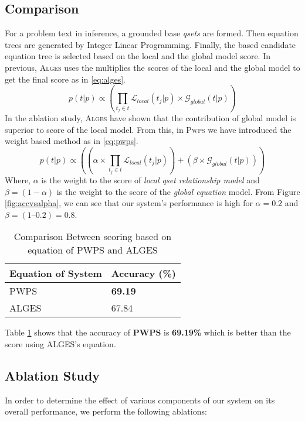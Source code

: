 \documentclass[document.tex]{subfiles}
\begin{document}
\subsection{Comparison}
For a problem text in inference, a grounded base \textit{qsets} are formed. Then equation trees are generated by Integer Linear Programming. Finally, the based candidate equation tree is selected based on the local and the global model score. In previous, \textsc{Alges} uses the multiplies the scores of the local and the global model to get the final score as in \eqref{eq:alges}.
\begin{equation}
p(t|p) \propto (\prod_{t_j \in t} \mathcal{L}_{local}(t_j|p) \times \mathcal{G}_{global}(t|p))
\label{eq:alges}
\end{equation}
In the ablation study, \textsc{Alges} have shown that the contribution of global model is superior to score of the local model. From this, in \textsc{Pwps} we have introduced the weight based method as in \eqref{eq:pwps}.
\begin{equation}
p(t|p) \propto( (\alpha  \times \prod_{t_j \in t} \mathcal{L}_{local}(t_j | p)) +( \beta \times \mathcal{G}_{global}(t|p)))
\label{eq:pwps}
\end{equation}
Where, $\alpha $ is the weight to the score of \textit{local qset relationship model} and $\beta = (1 - \alpha) $ is the weight to the score of the \textit{global equation} model.
From Figure \ref{fig:accvsalpha}, we can see that our system’s performance is high for $\alpha = 0.2$ and $\beta  = (1 – 0.2) = 0.8$.
\begin{table}[H]
	\caption{Comparison Between scoring based on equation of PWPS and ALGES}
	\begin{center}
		\begin{tabular}{|l|l|}
			\hline
			Equation of System & Accuracy (\%)\\
			\hline
			PWPS & \textbf{69.19}\\
			ALGES & 67.84\\
			\hline
		\end{tabular}
	\end{center}
	\label{tab:comp}
\end{table}


Table \ref{tab:comp} shows that the accuracy of \textbf{PWPS} is \textbf{69.19\%} which is better than the score using ALGES’s equation.

\subsection{Ablation Study}
In order to determine the effect of various components of our system on its overall performance, we perform the following ablations:
\end{document}
